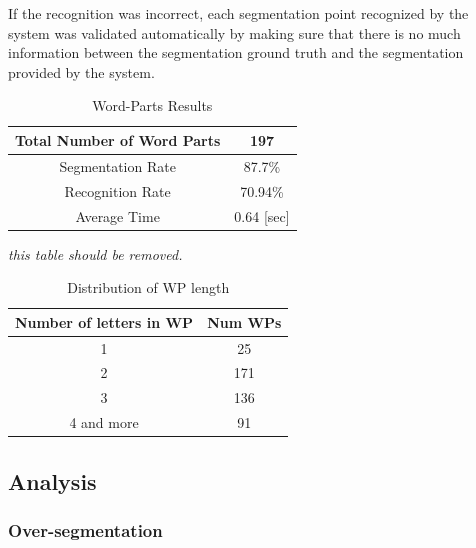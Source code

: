 \documentclass[journal,compsoc]{IEEEtran}
\begin{document}
If the recognition was incorrect, each segmentation point recognized by the system was validated automatically by making sure that there is no much information between the segmentation ground truth and the segmentation provided by the system.

\begin{table}[h]
\caption{Word-Parts Results}
\begin{tabular}{ | c | c | }
  \hline                     
    Total Number of Word Parts & 197 \\ 
  \hline
  Segmentation Rate &  87.7\% \\ 
 \hline
  Recognition Rate &  70.94\% \\ 
 \hline
  Average Time & 0.64 [sec] \\
\hline
\end{tabular}
\centering
\label{table:wp_results} 
\end{table}

\emph{this table should be removed.}
\begin{table}[h]
\caption{Distribution of WP length}
\begin{tabular}{ | c | c | }
\hline
Number of letters in WP & Num WPs\\
  \hline                     
    1 & 25 \\ 
  \hline
  2 &  171 \\ 
 \hline
 3 & 136 \\ 
 \hline
  4 and more & 91 \\
\hline
\end{tabular}
\centering
\label{table:wp_length_dist} 
\end{table}


\subsection{Analysis}

\subsubsection{Over-segmentation}
\end{document}

